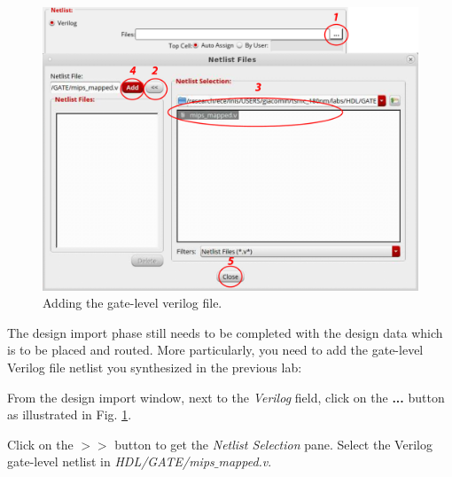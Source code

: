  \begin{enumerate}
	\parbox[t]{\dimexpr\textwidth-\leftmargin}{%
	\begin{figure}
		\vspace{0mm}
		\centering
		\vspace{-\baselineskip}
		\includegraphics[scale=0.31]{figures/lab5_backend/addverilog.pdf}
\caption{Adding the gate-level verilog file.}
\label{fig_addverilog}
	\end{figure}
The design import phase still needs to be completed with the design data which is to be placed and routed. More particularly, you need to add the gate-level Verilog file netlist you synthesized in the previous lab:
	\item From the design import window, next to the \textit{Verilog} field, click on the \textbf{...} button as illustrated in Fig. \ref{fig_addverilog}.
\item Click on the \textbf{$>>$} button to get the \textit{Netlist Selection} pane. Select the Verilog gate-level netlist in \textit{HDL/GATE/mips$\_$mapped.v}.

}
\end{enumerate}
